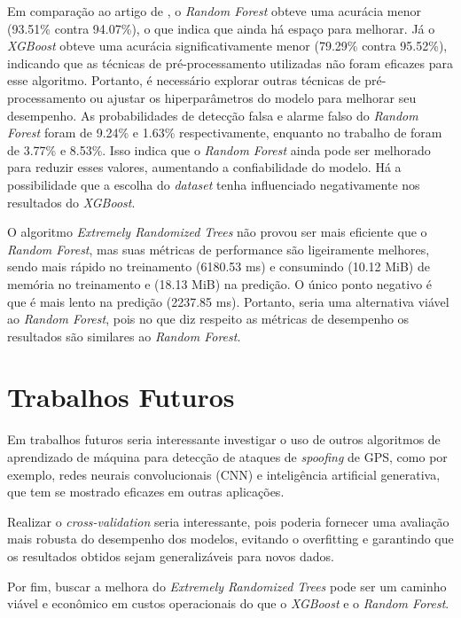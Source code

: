 \documentclass[12pt]{article}
\begin{document}
Em comparação ao artigo de \cite{Aissou2021},
o \textit{Random Forest} obteve uma acurácia menor
(93.51\% contra 94.07\%), o que indica que ainda há espaço para melhorar.
Já o \textit{XGBoost} obteve uma acurácia significativamente menor
(79.29\% contra 95.52\%), indicando que as técnicas de pré-processamento
utilizadas não foram eficazes para esse algoritmo.
Portanto, é necessário explorar outras técnicas de pré-processamento
ou ajustar os hiperparâmetros do modelo para melhorar seu desempenho.
As probabilidades de detecção falsa e alarme falso do \textit{Random Forest}
foram de 9.24\% e 1.63\% respectivamente, enquanto no trabalho de \cite{Aissou2021}
foram de 3.77\% e 8.53\%. Isso indica que o \textit{Random Forest} ainda pode ser melhorado
para reduzir esses valores, aumentando a confiabilidade do modelo.
Há a possibilidade que a escolha do \textit{dataset} tenha influenciado negativamente
nos resultados do \textit{XGBoost}.

O algoritmo \textit{Extremely Randomized Trees}
não provou ser mais eficiente que o \textit{Random Forest},
mas suas métricas de performance são ligeiramente melhores, sendo
mais rápido no treinamento (6180.53 ms) e consumindo (10.12 MiB) de memória
no treinamento e (18.13 MiB) na predição.
O único ponto negativo é que é mais lento na predição (2237.85 ms).
Portanto, seria uma alternativa viável ao \textit{Random Forest},
pois no que diz respeito as métricas de desempenho os resultados
são similares ao \textit{Random Forest}.


\section{Trabalhos Futuros}

Em trabalhos futuros seria interessante
investigar o uso de outros algoritmos de aprendizado de máquina
para detecção de ataques de \textit{spoofing} de GPS,
como por exemplo, redes neurais convolucionais (CNN) e inteligência artificial generativa,
que tem se mostrado eficazes em outras aplicações.
\cite{cnn2023, elalamiDroneDefGANtGenerativeAIBased2024}

Realizar o \textit{cross-validation}
seria interessante, pois poderia fornecer uma avaliação mais robusta
do desempenho dos modelos, evitando o overfitting e garantindo que os resultados
obtidos sejam generalizáveis para novos dados.

Por fim, buscar a melhora do
\textit{Extremely Randomized Trees} pode ser um caminho viável
e econômico em custos operacionais do que o \textit{XGBoost}
e o \textit{Random Forest}.

\FloatBarrier
\printbibliography
\end{document}
